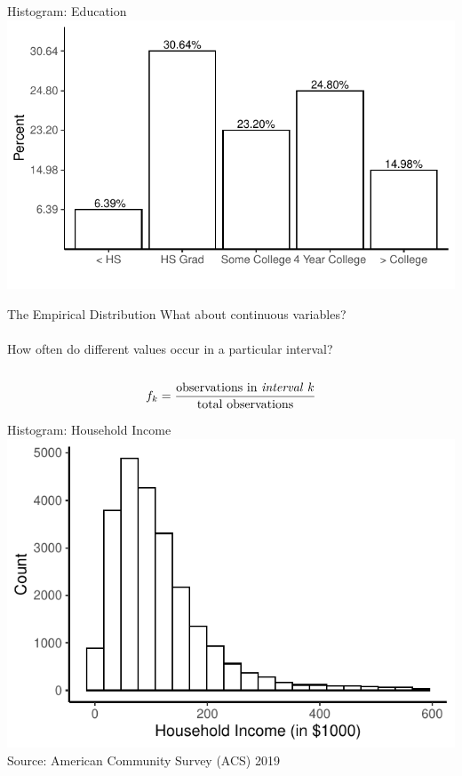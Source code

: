 \documentclass{./../div_teaching_slides}
\begin{document}
\begin{frame}{Histogram: Education}
\vspace{-0.5em}
\centering
\includegraphics{./../../Output/educ_hist.pdf}
\end{frame}

\begin{frame}{The Empirical Distribution}
What about continuous variables? \pause \\~\\
How often do different values occur in a particular interval? \\~\\
$$ f_k = \frac{\text{observations in \textit{interval} $k$}}{\text{total observations}} $$
\end{frame}

\begin{frame}{Histogram: Household Income}
\centering
\vspace{-0.9em}
\includegraphics{./../../Output/hhi_hist.pdf} \\
\scriptsize Source: American Community Survey (ACS) 2019
\end{frame}
\end{document}

